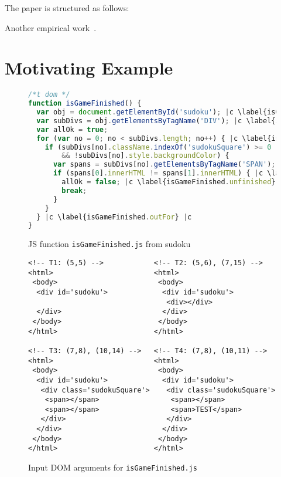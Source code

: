 \documentclass[sigconf]{acmart}
\begin{document}
The paper is structured as follows: 

Another empirical work~\cite{richards2010analysis}.

\section{Motivating Example}
\label{sec.example}

\begin{figure}[t]
  \begin{lstlisting}[style=htmlcssjs,language=JavaScript]
/*t dom */
function isGameFinished() {
  var obj = document.getElementById('sudoku'); |c \label{isGameFinished.getSudoku} |c
  var subDivs = obj.getElementsByTagName('DIV'); |c \label{isGameFinished.getDivs} |c
  var allOk = true;
  for (var no = 0; no < subDivs.length; no++) { |c \label{isGameFinished.inFor.begin} |c
    if (subDivs[no].className.indexOf('sudokuSquare') >= 0 |c \label{isGameFinished.if1.begin} |c 
        && !subDivs[no].style.backgroundColor) { 
      var spans = subDivs[no].getElementsByTagName('SPAN');
      if (spans[0].innerHTML != spans[1].innerHTML) { |c \label{isGameFinished.if2.begin} |c
        allOk = false; |c \label{isGameFinished.unfinished} |c
        break; 
      }
    }
  } |c \label{isGameFinished.outFor} |c
}
\end{lstlisting}
  \caption{JS function \texttt{isGameFinished.js} from sudoku}
  \label{code.isGameFinished}
\end{figure}

\begin{figure}[t]
  \begin{lstlisting}[style=htmlcssjs, language=HTML5]
<!-- T1: (5,5) -->            <!-- T2: (5,6), (7,15) -->
<html>                        <html>
 <body>                        <body>
  <div id='sudoku'>             <div id='sudoku'>
                                 <div></div>                           
  </div>                        </div> 
 </body>                       </body>    
</html>                       </html>  

<!-- T3: (7,8), (10,14) -->   <!-- T4: (7,8), (10,11) -->
<html>                        <html>
 <body>                        <body>
  <div id='sudoku'>             <div id='sudoku'>
   <div class='sudokuSquare'>    <div class='sudokuSquare'>
    <span></span>                 <span></span> 
    <span></span>                 <span>TEST</span>
   </div>                        </div> 
  </div>                        </div>
 </body>                       </body>
</html>                       </html>
  \end{lstlisting}
  \caption{Input DOM arguments for \texttt{isGameFinished.js}}
  \label{fig.isGameFinished.tests}
\end{figure}
\end{document}
